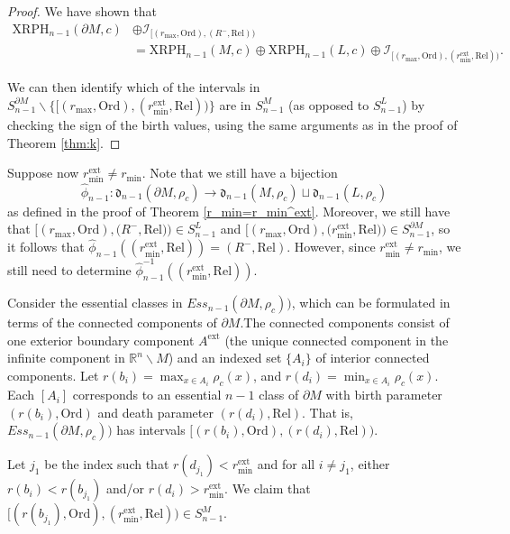 \documentclass[a4paper,11pt]{article}
\theoremstyle{definition}
\newcommand{\ext}{\text{ext}}
\newcommand{\death}{\mathfrak{d}}
\newcommand{\R}{\mathbb{R}}
\begin{document}
\begin{proof}
We have shown that 
\begin{align}\label{eq:k=n-1cimM}
\text{XRPH}_{n-1}(\partial M,c)&\oplus \mathcal{I}_{[(r_{\max},\text{Ord}),(R^-,\text{Rel}))}\\ \nonumber
&= \text{XRPH}_{n-1}(M,c)\oplus \text{XRPH}_{n-1}(L,c)\oplus \mathcal{I}_{[(r_{\max},\text{Ord}),(r_{\min}^\mathrm{ext},\text{Rel}))}. 
\end{align}

We can then identify which of the intervals in $S_{n-1}^{\partial M}\backslash \{[(r_{\max},\text{Ord}),(r_{\min}^\mathrm{ext},\text{Rel}))\}$ are in $S_{n-1}^M$ (as opposed to $S_{n-1}^L$) by checking the sign of the birth values, using the same arguments as in the proof of Theorem \ref{thm:k}.

\end{proof}

Suppose now $r_{\min}^\mathrm{ext}\neq r_{\min}$. Note that we still have a bijection 
$$\hat{\phi}_{n-1}:\death_{n-1}(\partial M, \rho_c) \to \death_{n-1}(M, \rho_c)\sqcup \death_{n-1}(L, \rho_c)$$ as defined in the proof of Theorem \ref{r_min=r_min^ext}. 
Moreover, we still have that $[(r_{\max},\mathrm{Ord}),(R^-,\mathrm{Rel))}\in S_{n-1}^{L}$ and $[(r_{\max},\mathrm{Ord}),(r_{\min}^{\mathrm{ext}},\mathrm{Rel))}\in S_{n-1}^{\partial M}$, so it follows that  $\hat{\phi}_{n-1}((r^\mathrm{ext}_{\min}, \mathrm{Rel}))=(R^-,\mathrm{Rel})$. However, since $r_{\min}^\mathrm{ext}\ne r_{\min}$, we still need to determine $\hat{\phi}_{n-1}^{-1}((r^\mathrm{ext}_{\min}, \mathrm{Rel}))$.


Consider the essential classes in $Ess_{n-1}(\partial M, \rho_c))$, which can be formulated in terms of the connected components of $\partial M$.The connected components consist of one exterior boundary component $A^{\ext}$ (the unique  connected component in the infinite component in $\R^n \backslash M$) and an indexed set $\{A_i\}$ of interior connected components.  Let $r(b_i)=\max_{x\in A_i}\rho_c(x)$, and $r(d_i)=\min_{x\in A_i} \rho_c(x)$. Each $[A_i]$ corresponds to an essential $n-1$ class of $\partial M$ with birth parameter $(r(b_i), \mathrm{Ord})$ and death parameter $(r(d_i), \mathrm{Rel})$. That is, $Ess_{n-1}(\partial M, \rho_c))$ has intervals $[(r(b_i), \textrm{Ord}), (r(d_i), \textrm{Rel}))$.

Let $j_1$ be the index such that $r(d_{j_1}) < r^\mathrm{ext}_{\min}$ and for all $i\neq j_1$, either $r(b_i)<r(b_{j_1})$ 
and/or $r(d_i)>r^\mathrm{ext}_{\min}$. We claim that $[(r(b_{j_1}), \mathrm{Ord}), (r_{\min}^\mathrm{ext}, \mathrm{Rel}))\in S_{n-1}^{M}$. 
\end{document}
